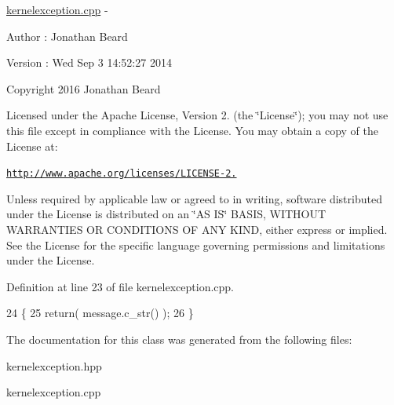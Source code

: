 \hyperlink{kernelexception_8cpp_source}{kernelexception.\+cpp} -\/ \begin{DoxyAuthor}{Author}
\+: Jonathan Beard 
\end{DoxyAuthor}
\begin{DoxyVersion}{Version}
\+: Wed Sep 3 14\+:52\+:27 2014
\end{DoxyVersion}
Copyright 2016 Jonathan Beard

Licensed under the Apache License, Version 2. (the \char`\"{}\+License\char`\"{}); you may not use this file except in compliance with the License. You may obtain a copy of the License at\+:

\href{http://www.apache.org/licenses/LICENSE-2.0}{\tt http\+://www.\+apache.\+org/licenses/\+L\+I\+C\+E\+N\+S\+E-\/2.}

Unless required by applicable law or agreed to in writing, software distributed under the License is distributed on an \char`\"{}\+A\+S I\+S\char`\"{} B\+A\+S\+IS, W\+I\+T\+H\+O\+UT W\+A\+R\+R\+A\+N\+T\+I\+ES OR C\+O\+N\+D\+I\+T\+I\+O\+NS OF A\+NY K\+I\+ND, either express or implied. See the License for the specific language governing permissions and limitations under the License. 

Definition at line 23 of file kernelexception.\+cpp.


\begin{DoxyCode}
24 \{
25    \textcolor{keywordflow}{return}( message.c\_str() );
26 \}
\end{DoxyCode}


The documentation for this class was generated from the following files\+:\begin{DoxyCompactItemize}
\item 
kernelexception.\+hpp\item 
kernelexception.\+cpp\end{DoxyCompactItemize}
